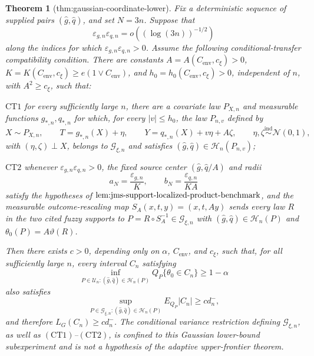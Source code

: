 \documentclass{article}
\newtheorem{theorem}{Theorem}
\begin{document}
\begin{theorem}[thm:gaussian-coordinate-lower]\label{thm:gaussian-coordinate-lower}
Fix a deterministic sequence of supplied pairs \((\widehat g,\widehat q)\), and set \(N=3n\).  Suppose that
\[
 \varepsilon_{g,n}\varepsilon_{q,n}
 =o\!\left((\log(3n))^{-1/2}\right)
\]
along the indices for which \(\varepsilon_{g,n}\varepsilon_{q,n}>0\).  Assume the following conditional-transfer compatibility condition.  There are constants \(A=A(C_{\mathrm{env}},c_\xi)>0\), \(K=K(C_{\mathrm{env}},c_\xi)\ge e(1\vee C_{\mathrm{env}})\), and \(h_0=h_0(C_{\mathrm{env}},c_\xi)>0\), independent of \(n\), with \(A^2\ge c_\xi\), such that:

\(\mathrm{CT1}\) for every sufficiently large \(n\), there are a covariate law \(P_{X,n}\) and measurable functions \(g_{*,n},q_{*,n}\) for which, for every \(|v|\le h_0\), the law \(P_{n,v}\) defined by
\[
 X\sim P_{X,n},\qquad
 T=g_{*,n}(X)+\eta,\qquad
 Y=q_{*,n}(X)+v\eta+A\zeta,
 \qquad \eta,\zeta\stackrel{\mathrm{ind}}{\sim}\mathcal N(0,1),
\]
with \((\eta,\zeta)\perp X\), belongs to \(\mathcal G_{\xi,n}\) and satisfies \((\widehat g,\widehat q)\in\mathcal H_n(P_{n,v})\);

\(\mathrm{CT2}\) whenever \(\varepsilon_{g,n}\varepsilon_{q,n}>0\), the fixed source center \((\widehat g,\widehat q/A)\) and radii
\[
 a_N=\frac{\varepsilon_{g,n}}{K},
 \qquad
 b_N=\frac{\varepsilon_{q,n}}{KA}
\]
satisfy the hypotheses of \(\textup{lem:jms-support-localized-product-benchmark}\), and the measurable outcome-rescaling map \(S_A(x,t,y)=(x,t,Ay)\) sends every law \(R\) in the two cited fuzzy supports to \(P=R\circ S_A^{-1}\in\mathcal G_{\xi,n}\) with \((\widehat g,\widehat q)\in\mathcal H_n(P)\) and \(\theta_0(P)=A\vartheta(R)\).

Then there exists \(c>0\), depending only on \(\alpha\), \(C_{\mathrm{env}}\), and \(c_\xi\), such that, for all sufficiently large \(n\), every interval \(C_n\) satisfying
\[
 \inf_{P\in\mathcal U_n:(\widehat g,\widehat q)\in\mathcal H_n(P)}
 Q_P\{\theta_0\in C_n\}\ge1-\alpha
\]
also satisfies
\[
 \sup_{P\in\mathcal G_{\xi,n}:(\widehat g,\widehat q)\in\mathcal H_n(P)}
 E_{Q_P}|C_n|\ge c d_n^- ,
\]
and therefore \(L_G(C_n)\ge c d_n^-\).  The conditional variance restriction defining \(\mathcal G_{\xi,n}\), as well as \((\mathrm{CT1})\)--\((\mathrm{CT2})\), is confined to this Gaussian lower-bound subexperiment and is not a hypothesis of the adaptive upper-frontier theorem.
\end{theorem}
\end{document}

